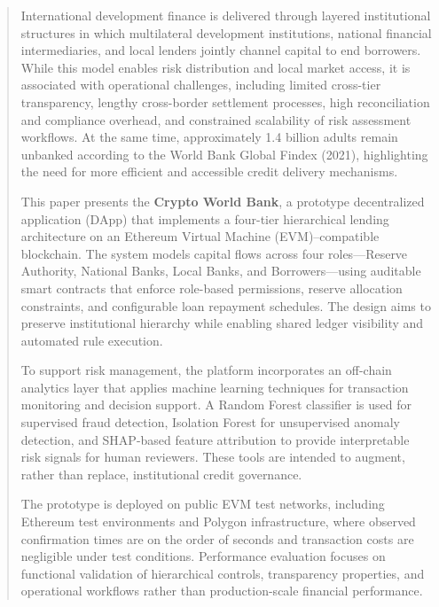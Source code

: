 \documentclass[11pt,a4paper]{article}
\begin{document}
\newpage


\renewcommand{\abstractname}{\Large\bfseries\color{PrimaryBlue}Abstract}
\begin{abstract}
\normalsize

International development finance is delivered through layered institutional structures in which multilateral development institutions, national financial intermediaries, and local lenders jointly channel capital to end borrowers. While this model enables risk distribution and local market access, it is associated with operational challenges, including limited cross-tier transparency, lengthy cross-border settlement processes, high reconciliation and compliance overhead, and constrained scalability of risk assessment workflows. At the same time, approximately 1.4 billion adults remain unbanked according to the World Bank Global Findex (2021), highlighting the need for more efficient and accessible credit delivery mechanisms.

This paper presents the \textbf{Crypto World Bank}, a prototype decentralized application (DApp) that implements a four-tier hierarchical lending architecture on an Ethereum Virtual Machine (EVM)--compatible blockchain. The system models capital flows across four roles---Reserve Authority, National Banks, Local Banks, and Borrowers---using auditable smart contracts that enforce role-based permissions, reserve allocation constraints, and configurable loan repayment schedules. The design aims to preserve institutional hierarchy while enabling shared ledger visibility and automated rule execution.

To support risk management, the platform incorporates an off-chain analytics layer that applies machine learning techniques for transaction monitoring and decision support. A Random Forest classifier is used for supervised fraud detection, Isolation Forest for unsupervised anomaly detection, and SHAP-based feature attribution to provide interpretable risk signals for human reviewers. These tools are intended to augment, rather than replace, institutional credit governance.

The prototype is deployed on public EVM test networks, including Ethereum test environments and Polygon infrastructure, where observed confirmation times are on the order of seconds and transaction costs are negligible under test conditions. Performance evaluation focuses on functional validation of hierarchical controls, transparency properties, and operational workflows rather than production-scale financial performance.


\end{abstract}
\end{document}

